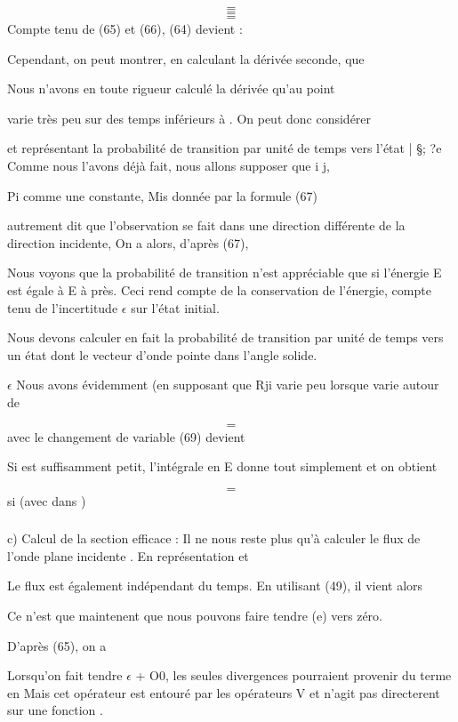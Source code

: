 
\[
\tag{66}=
\]
\[
\tag{67}=
\]
\[
\tag{68}=
\]
Compte tenu de (65) et (66), (64) devient :

 Cependant, on peut montrer, en calculant la dérivée seconde, que

Nous n'avons en toute rigueur calculé la dérivée  qu'au point

 varie très peu sur des temps inférieurs à . On peut donc considérer


et représentant la probabilité de transition par unité de temps vers
l'état | \S; ?e
Comme nous l'avons déjà fait, nous allons supposer que i  j,

Pi comme une constante, Mis donnée par la formule (67)

autrement dit que l'observation se fait dans une direction différente de
la direction incidente, On a alors, d'après (67),

Nous voyons que la probabilité de transition n'est appréciable
que si l'énergie E est égale à E à  près. Ceci rend compte de la conservation
de l'énergie, compte tenu de l'incertitude $\epsilon$ sur l'état initial.

Nous devons calculer en fait la probabilité de transition par
unité de temps vers un état dont le vecteur d'onde  pointe
dans l'angle solide.


 $\epsilon$ 
Nous avons évidemment (en supposant que Rji varie peu lorsque
 varie autour de 

\[
\tag{69}=
\]
avec le changement de variable
 (69) devient

Si  est suffisamment petit, l'intégrale en E donne tout simplement 
et on obtient

\[
\tag{70}=
\]
si (avec  dans )

\subsubsection{}%
c) Calcul de la section efficace :
Il ne nous reste plus qu'à calculer le flux de l'onde plane
incidente . En représentation  et 

Le flux est également indépendant du temps. En utilisant (49), il vient
alors

Ce n'est que maintenent que nous pouvons faire tendre (e) vers zéro.

D'après (65), on a


Lorsqu'on fait tendre $\epsilon$ + O0, les seules divergences pourraient provenir
du terme en  Mais cet opérateur est entouré par les opérateurs V et n'agit pas
directerent sur une fonction .

